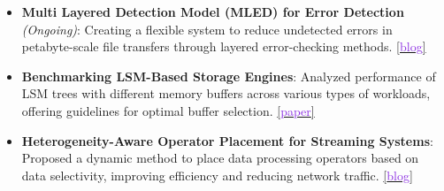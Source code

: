 \documentclass[10pt,a4paper,calibri]{moderncv}
\begin{document}
\begin{itemize}
	\item \textbf{Multi Layered Detection Model (MLED) for Error Detection} \textit{(Ongoing)}: Creating a flexible system to reduce undetected errors in petabyte-scale file transfers through layered error-checking methods.
	      \href{https://github.com/shubham-sudo/mled}{[\textcolor{blueviolet}{blog}]}

	\item \textbf{Benchmarking LSM-Based Storage Engines}: Analyzed performance of LSM trees with different memory buffers across various types of workloads, offering guidelines for optimal buffer selection.
	      \href{https://shubhamkaushik.com/assets/pdf/LSMMemory.pdf}{[\textcolor{blueviolet}{paper}]}

	\item \textbf{Heterogeneity-Aware Operator Placement for Streaming Systems}: Proposed a dynamic method to place data processing operators based on data selectivity, improving efficiency and reducing network traffic.
	      \href{https://github.com/shubham-sudo/HeterogeneityAwareOperatorPlacementforStreamProcessingSystemsAtEdge-RaspberryPi}{[\textcolor{blueviolet}{blog}]}


\end{itemize}
\end{document}

